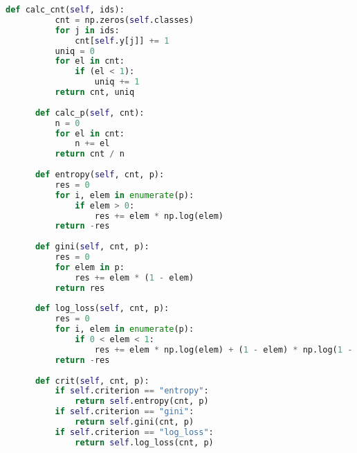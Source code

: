 \begin{lstlisting}[language=python, keepspaces=true]
      def calc_cnt(self, ids):
          cnt = np.zeros(self.classes)
          for j in ids:
              cnt[self.y[j]] += 1
          uniq = 0
          for el in cnt:
              if (el < 1):
                  uniq += 1        
          return cnt, uniq
  
      def calc_p(self, cnt):
          n = 0
          for el in cnt:
              n += el
          return cnt / n
  
      def entropy(self, cnt, p):
          res = 0
          for i, elem in enumerate(p):
              if elem > 0:
                  res += elem * np.log(elem)
          return -res
      
      def gini(self, cnt, p):
          res = 0
          for elem in p:
              res += elem * (1 - elem)
          return res
  
      def log_loss(self, cnt, p):
          res = 0
          for i, elem in enumerate(p):
              if 0 < elem < 1:
                  res += elem * np.log(elem) + (1 - elem) * np.log(1 - elem)
          return -res
  
      def crit(self, cnt, p):
          if self.criterion == "entropy":
              return self.entropy(cnt, p)
          if self.criterion == "gini":
              return self.gini(cnt, p)
          if self.criterion == "log_loss":
              return self.log_loss(cnt, p)
  

\end{lstlisting}
